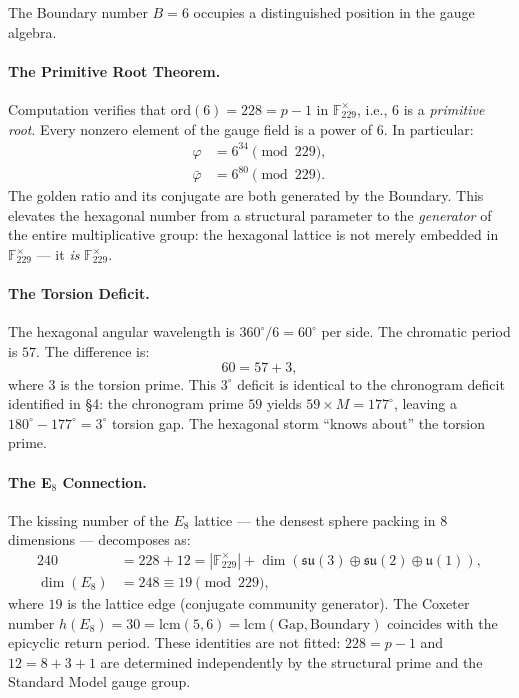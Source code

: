 The Boundary number $B = 6$ occupies a distinguished position in the gauge algebra.

\paragraph{The Primitive Root Theorem.}
Computation verifies that $\mathrm{ord}(6) = 228 = p - 1$ in $\mathbb{F}_{229}^{\times}$, i.e., $6$ is a \emph{primitive root}. Every nonzero element of the gauge field is a power of $6$. In particular:
\begin{align}
    \varphi &= 6^{34} \pmod{229}, \\
    \bar{\varphi} &= 6^{80} \pmod{229}.
\end{align}
The golden ratio and its conjugate are both generated by the Boundary. This elevates the hexagonal number from a structural parameter to the \emph{generator} of the entire multiplicative group: the hexagonal lattice is not merely embedded in $\mathbb{F}_{229}^{\times}$ --- it \emph{is} $\mathbb{F}_{229}^{\times}$.

\paragraph{The Torsion Deficit.}
The hexagonal angular wavelength is $360^{\circ}/6 = 60^{\circ}$ per side. The chromatic period is $57$. The difference is:
\[
    60 = 57 + 3,
\]
where $3$ is the torsion prime. This $3^{\circ}$ deficit is identical to the chronogram deficit identified in \S4: the chronogram prime $59$ yields $59 \times M = 177^{\circ}$, leaving a $180^{\circ} - 177^{\circ} = 3^{\circ}$ torsion gap. The hexagonal storm ``knows about'' the torsion prime.

\paragraph{The E$_8$ Connection.}
The kissing number of the $E_8$ lattice --- the densest sphere packing in 8 dimensions --- decomposes as:
\begin{align}
    240 &= 228 + 12 = |\mathbb{F}_{229}^{\times}| + \dim(\mathfrak{su}(3) \oplus \mathfrak{su}(2) \oplus \mathfrak{u}(1)), \\
    \dim(E_8) &= 248 \equiv 19 \pmod{229},
\end{align}
where $19$ is the lattice edge (conjugate community generator). The Coxeter number $h(E_8) = 30 = \mathrm{lcm}(5, 6) = \mathrm{lcm}(\text{Gap}, \text{Boundary})$ coincides with the epicyclic return period. These identities are not fitted: $228 = p - 1$ and $12 = 8 + 3 + 1$ are determined independently by the structural prime and the Standard Model gauge group.

